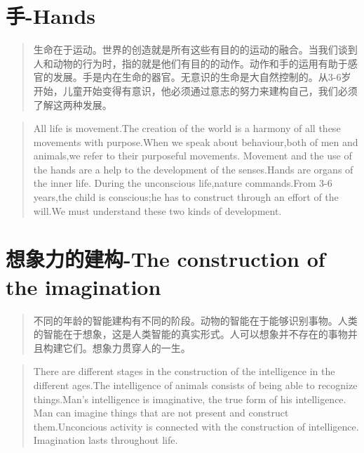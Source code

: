 \documentclass[lang=cn,10pt]{elegantbook}
\begin{document}
\chapter{手-Hands}

\begin{quote}
  {\small 生命在于运动。世界的创造就是所有这些有目的的运动的融合。当我们谈到人和动物的行为时，指的就是他们有目的的动作。动作和手的运用有助于感官的发展。手是内在生命的器官。无意识的生命是大自然控制的。从3-6岁开始，儿童开始变得有意识，他必须通过意志的努力来建构自己，我们必须了解这两种发展。}
\end{quote}

\begin{tcolorbox}
  \begin{quote}
    {\small All life is movement.The creation of the world is a harmony of all these movements with purpose.When we speak about behaviour,both of men and animals,we refer to their purposeful movements. Movement and the use of the hands are a help to the development of the senses.Hands are organs of the inner life. During the unconscious life,nature commands.From 3-6 years,the child is conscious;he has to construct through an effort of the will.We must understand these two kinds of development.}
  \end{quote}
\end{tcolorbox}

\chapter{想象力的建构-The construction of the imagination}

\begin{quote}
  {\small 不同的年龄的智能建构有不同的阶段。动物的智能在于能够识别事物。人类的智能在于想象，这是人类智能的真实形式。人可以想象并不存在的事物并且构建它们。想象力贯穿人的一生。}
\end{quote}

\begin{tcolorbox}
  \begin{quote}
    {\small There are different stages in the construction of the intelligence in the different ages.The intelligence of animals consists of being able to recognize things.Man's intelligence is imaginative, the true form of his intelligence. Man can imagine things that are not present and construct them.Unconcious activity is connected with the construction of intelligence. Imagination lasts throughout life.}
  \end{quote}
\end{tcolorbox}
\end{document}
